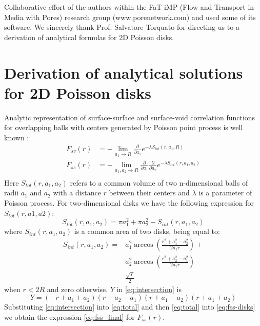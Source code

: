 \documentclass[reprint,amsmath,amssymb,aps,pre]{revtex4-1}
\begin{document}
Collaborative effort of the authors within the FaT iMP (Flow and Transport in
Media with Pores) research group (www.porenetwork.com) and used some of its
software. We sincerely thank Prof. Salvatore Torquato for directing us to a
derivation of analytical formulas for 2D Poisson disks.

\appendix
\section{Derivation of analytical solutions for 2D Poisson disks}
\label{ap:overlapping-disks}
Analytic representation of surface-surface and surface-void correlation
functions for overlapping balls with centers generated by Poisson point process
is well known \cite{Torq_book}:
\begin{align}
  F_{sv}(r) &= -\lim_{a_1 \rightarrow R} \frac{\partial}{\partial a_1}
  e^{-\lambda S_{tot}(r, a_1, R)} \label{eq:fsv-disks} \\
  F_{ss}(r) &= -\lim_{a_1, a_2 \rightarrow R} \frac{\partial}{\partial a_1}
  \frac{\partial}{\partial a_2} e^{-\lambda S_{tot}(r, a_1,
    a_2)} \label{eq:fss-disks} \\
\end{align}
Here $S_{tot}(r, a_1, a_2)$ refers to a common volume of two n-dimensional balls
of radii $a_1$ and $a_2$ with a distance $r$ between their centers and $\lambda$
is a parameter of Poisson process. For two-dimensional disks we have the
following expression for $S_{tot}(r, a1, a2)$:
\begin{equation}
  S_{tot}(r, a_1, a_2) = \pi a_1^2 + \pi a_2^2 - S_{int}(r, a_1, a_2) \label{eq:total}
\end{equation}
where $S_{int}(r, a_1, a_2)$ is a common area of two disks, being equal to:
\cite{Math_stack_link}
\begin{align}
  S_{int}(r, a_1, a_2) =&  a_1^2 \arccos(\frac{r^2+a_1^2-a_2^2}{2a_1r}) + \\
  & a_2^2 \arccos(\frac{r^2+a_2^2-a_1^2}{2a_2r}) - \\
  & \frac{\sqrt{Y}}{2} \label{eq:intersection}
\end{align}
when $r<2R$ and zero otherwise. $Y$ in \cref{eq:intersection} is
\begin{equation*}
  Y = (-r+a_1+a_2)(r+a_2-a_1)(r+a_1-a_2)(r+a_1+a_2)
\end{equation*}
Substituting \cref{eq:intersection} into \cref{eq:total} and then
\cref{eq:total} into \cref{eq:fss-disks} we obtain the expression
\cref{eq:fss_final} for $F_{ss}(r)$.
\end{document}
